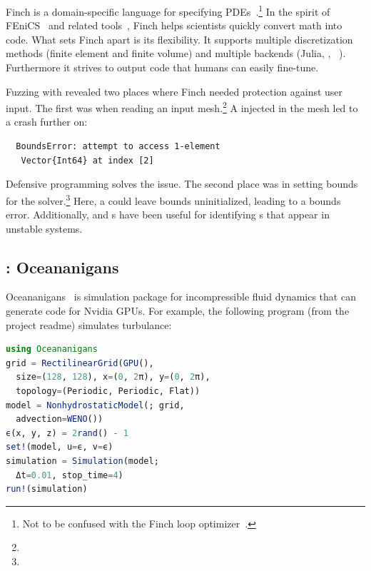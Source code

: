\documentclass{juliacon}
\begin{document}
Finch is a domain-specific language for specifying
PDEs~\cite{heislerFinchDomainSpecific2022}.\footnote{Not to be confused
with the Finch loop optimizer~\cite{adka-cgo-2023}.}
In the spirit of FEniCS~\cite{fenics} and related
tools~\cite{freefem,openfoam,dune,firedrake},
Finch helps scientists quickly convert math into code.
What sets Finch apart is its flexibility.
It supports multiple discretization methods (finite element and finite
volume) and multiple backends (Julia, \CPP{}, \Dendro{}~\cite{dendro}).
Furthermore it strives to output code that humans can easily fine-tune.

Fuzzing with \FT{} revealed two places where Finch needed
protection against user input.
The first was when reading an input mesh.\footnote{}
A \NaN{} injected in the mesh led to a crash further on:

\begin{verbatim}
  BoundsError: attempt to access 1-element
   Vector{Int64} at index [2]
\end{verbatim}

Defensive programming solves the issue.
The second place was in setting bounds for the
solver.\footnote{}
Here, a \NaN{} could leave bounds uninitialized, leading to a bounds error.
Additionally, \FT{} and \CSTG{}s have been useful for identifying \NaN{}s that
appear in unstable systems.

\subsection{\GPUFPX{}: Oceananigans}
\label{s:ocean}

Oceananigans~\cite{OceananigansJOSS} is simulation package for incompressible
fluid dynamics that can generate code for Nvidia GPUs.
For example, the following program (from the project readme) simulates turbulance:

\begin{lstlisting}[language = Julia]
using Oceananigans
grid = RectilinearGrid(GPU(),
  size=(128, 128), x=(0, 2π), y=(0, 2π),
  topology=(Periodic, Periodic, Flat))
model = NonhydrostaticModel(; grid,
  advection=WENO())
ϵ(x, y, z) = 2rand() - 1
set!(model, u=ϵ, v=ϵ)
simulation = Simulation(model;
  Δt=0.01, stop_time=4)
run!(simulation)
\end{lstlisting}
\end{document}

